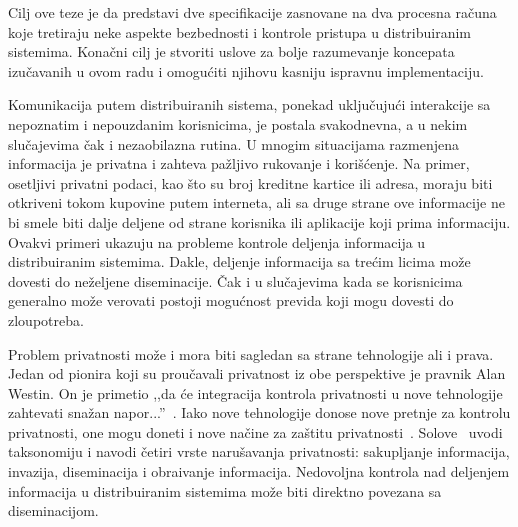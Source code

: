 Cilj ove teze je da predstavi dve specifikacije zasnovane na dva procesna ra\v cuna koje tretiraju neke aspekte bezbednosti i kontrole pristupa u distribuiranim sistemima. Kona\v cni cilj je stvoriti uslove za bolje razumevanje koncepata izu\v cavanih u ovom radu i omogu\' citi njihovu kasniju ispravnu implementaciju.

Komunikacija putem distribuiranih sistema, ponekad uklju\v cuju\' ci interakcije sa nepoznatim i nepouzdanim korisnicima, je postala svakodnevna, a u nekim slu\v cajevima \v cak i nezaobilazna rutina. U mnogim situacijama razmenjena informacija je privatna i zahteva pa\v zljivo rukovanje i kori\v s\' cenje. Na primer, osetljivi privatni podaci, kao \v sto su broj kreditne kartice ili adresa, moraju biti otkriveni tokom kupovine putem interneta, ali sa druge strane ove informacije ne bi smele biti dalje deljene od strane korisnika ili aplikacije koji prima informaciju. Ovakvi primeri ukazuju na probleme kontrole deljenja informacija u distribuiranim sistemima. Dakle, deljenje informacija sa tre\' cim licima mo\v ze dovesti do ne\v zeljene diseminacije. \v Cak i u slu\v cajevima kada se korisnicima generalno mo\v ze verovati postoji mogu\' cnost previda koji mogu dovesti do zloupotreba.
 
Problem privatnosti mo\v ze i mora biti sagledan sa strane tehnologije ali i prava. Jedan od pionira koji su prou\v cavali privatnost iz obe perspektive je pravnik Alan Westin. On je primetio ,,da \' ce integracija kontrola privatnosti u nove tehnologije zahtevati sna\v zan napor...''~\cite{westin2003social}.
Iako nove tehnologije donose nove pretnje za kontrolu privatnosti, one mogu doneti i nove na\v cine za za\v stitu privatnosti~\cite{DBLP:conf/fm/TschantzW09}. 
Solove~\cite{solove2005taxonomy} uvodi taksonomiju i navodi \v cetiri vrste naru\v savanja privatnosti: sakupljanje informacija, invazija, diseminacija i obra\dj ivanje informacija. Nedovoljna kontrola nad deljenjem informacija u distribuiranim sistemima mo\v ze biti direktno povezana sa diseminacijom.


